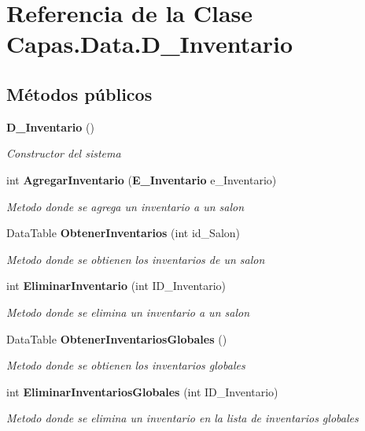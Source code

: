 \section{Referencia de la Clase Capas.\+Data.\+D\+\_\+\+Inventario}
\label{class_capas_1_1_data_1_1_d___inventario}
\subsection*{Métodos públicos}
\begin{DoxyCompactItemize}
\item 
{\bf D\+\_\+\+Inventario} ()
\begin{DoxyCompactList}\small\item\em Constructor del sistema \end{DoxyCompactList}\item 
int {\bf Agregar\+Inventario} ({\bf E\+\_\+\+Inventario} e\+\_\+\+Inventario)
\begin{DoxyCompactList}\small\item\em Metodo donde se agrega un inventario a un salon \end{DoxyCompactList}\item 
Data\+Table {\bf Obtener\+Inventarios} (int id\+\_\+\+Salon)
\begin{DoxyCompactList}\small\item\em Metodo donde se obtienen los inventarios de un salon \end{DoxyCompactList}\item 
int {\bf Eliminar\+Inventario} (int I\+D\+\_\+\+Inventario)
\begin{DoxyCompactList}\small\item\em Metodo donde se elimina un inventario a un salon \end{DoxyCompactList}\item 
Data\+Table {\bf Obtener\+Inventarios\+Globales} ()
\begin{DoxyCompactList}\small\item\em Metodo donde se obtienen los inventarios globales \end{DoxyCompactList}\item 
int {\bf Eliminar\+Inventarios\+Globales} (int I\+D\+\_\+\+Inventario)
\begin{DoxyCompactList}\small\item\em Metodo donde se elimina un inventario en la lista de inventarios globales \end{DoxyCompactList}\item 

\end{DoxyCompactItemize}

